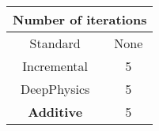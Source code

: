 \documentclass[varwidth=10.5cm,border=2mm]{standalone}
\begin{document}
    \begin{center}
        \begin{table}[htbp]
            \centering
            \begin{tabular}{cc}
                \toprule
                \multicolumn{2}{c}{\textbf{Number of iterations}} \\
                \midrule
                Standard & None \\
                \cmidrule(lr){1-2}
                Incremental & 5 \\
                \cmidrule(lr){1-2}
                DeepPhysics & 5 \\
                \cmidrule(lr){1-2}
                \textbf{Additive} & 5 \\
                \bottomrule
            \end{tabular}
        \end{table}
    \end{center}
\end{document}

